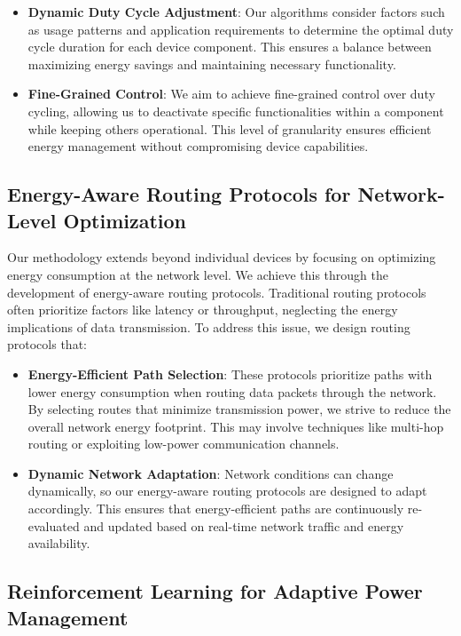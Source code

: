 \documentclass[11pt,a4paper]{article}
\begin{document}
\begin{itemize}
    \item \textbf{Dynamic Duty Cycle Adjustment}: Our algorithms consider factors such as usage patterns and application requirements to determine the optimal duty cycle duration for each device component. This ensures a balance between maximizing energy savings and maintaining necessary functionality.

    \item \textbf{Fine-Grained Control}: We aim to achieve fine-grained control over duty cycling, allowing us to deactivate specific functionalities within a component while keeping others operational. This level of granularity ensures efficient energy management without compromising device capabilities.
\end{itemize}

\subsection{Energy-Aware Routing Protocols for Network-Level Optimization}

Our methodology extends beyond individual devices by focusing on optimizing energy consumption at the network level. We achieve this through the development of energy-aware routing protocols. Traditional routing protocols often prioritize factors like latency or throughput, neglecting the energy implications of data transmission.  To address this issue, we design routing protocols that:
\begin{itemize}
    \item \textbf{Energy-Efficient Path Selection}: These protocols prioritize paths with lower energy consumption when routing data packets through the network. By selecting routes that minimize transmission power, we strive to reduce the overall network energy footprint.  This may involve techniques like multi-hop routing or exploiting low-power communication channels.
    \item \textbf{Dynamic Network Adaptation}: Network conditions can change dynamically, so our energy-aware routing protocols are designed to adapt accordingly. This ensures that energy-efficient paths are continuously re-evaluated and updated based on real-time network traffic and energy availability.
\end{itemize}

\subsection{Reinforcement Learning for Adaptive Power Management}
\end{document}
